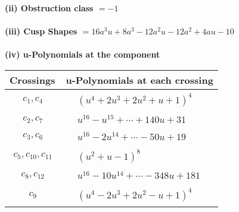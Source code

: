 \documentclass[1p]{elsarticle_modified}
\theoremstyle{definition}
\begin{document}
\flushleft \textbf{(ii) Obstruction class $= -1$}\\~\\
\flushleft \textbf{(iii) Cusp Shapes $= 16 a^3 u+8 a^3-12 a^2 u-12 a^2+4 a u-10$}\\~\\
\newpage\renewcommand{\arraystretch}{1}
\flushleft \textbf{(iv) u-Polynomials at the component}\newline \\
\begin{tabular}{m{50pt}|m{274pt}}
Crossings & \hspace{64pt}u-Polynomials at each crossing \\
\hline $$\begin{aligned}c_{1},c_{4}\end{aligned}$$&$\begin{aligned}
&(u^4+2 u^3+2 u^2+u+1)^4
\end{aligned}$\\
\hline $$\begin{aligned}c_{2},c_{7}\end{aligned}$$&$\begin{aligned}
&u^{16}- u^{15}+\cdots+140 u+31
\end{aligned}$\\
\hline $$\begin{aligned}c_{3},c_{6}\end{aligned}$$&$\begin{aligned}
&u^{16}-2 u^{14}+\cdots-50 u+19
\end{aligned}$\\
\hline $$\begin{aligned}c_{5},c_{10},c_{11}\end{aligned}$$&$\begin{aligned}
&(u^2+u-1)^8
\end{aligned}$\\
\hline $$\begin{aligned}c_{8},c_{12}\end{aligned}$$&$\begin{aligned}
&u^{16}-10 u^{14}+\cdots-348 u+181
\end{aligned}$\\
\hline $$\begin{aligned}c_{9}\end{aligned}$$&$\begin{aligned}
&(u^4-2 u^3+2 u^2- u+1)^4
\end{aligned}$\\
\hline
\end{tabular}\\~\\
\end{document}
